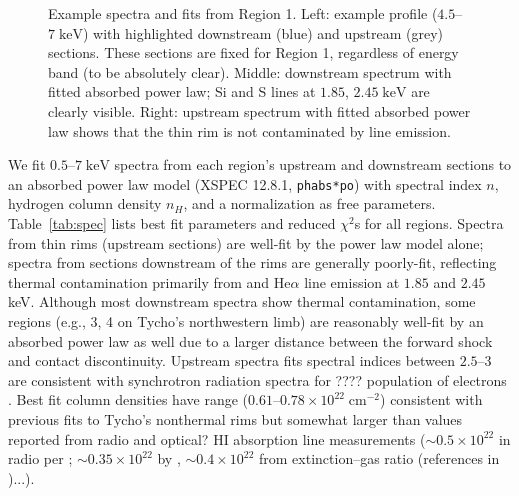 \documentclass[iop, apj, numberedappendix, twocolappendix]{emulateapj}
\newcommand*{\mt}{\mathrm}
\newcommand*{\unit}[1]{\;\mt{#1}}  %
\newcommand*{\abt}{\mathord{\sim}} %
\begin{document}
\begin{figure}
    \caption{Example spectra and fits from Region 1. Left: example profile
    ($4.5$--$7 \unit{keV}$) with highlighted downstream (blue) and upstream
    (grey) sections. These sections are fixed for Region 1, regardless of
    energy band (to be absolutely clear).  Middle: downstream spectrum with
    fitted absorbed power law; Si and S lines at $1.85$, $2.45 \unit{keV}$ are
    clearly visible.  Right: upstream spectrum with fitted absorbed power law
    shows that the thin rim is not contaminated by line emission.}
    \label{fig:spec}
\end{figure}

We fit $0.5$--$7 \unit{keV}$ spectra from each region's upstream and downstream
sections to an absorbed power law model (XSPEC 12.8.1, \texttt{phabs*po}) with
spectral index $n$, hydrogen column density $n_H$, and a normalization as free
parameters.  Table~\ref{tab:spec} lists best fit parameters and reduced
$\chi^2$s for all regions.  Spectra from thin rims (upstream sections) are
well-fit by the power law model alone; spectra from sections downstream of the
rims are generally poorly-fit, reflecting thermal contamination primarily from
 and  He$\alpha$ line emission at $1.85$ and $2.45$ keV.
Although most downstream spectra show thermal contamination, some regions
(e.g., 3, 4 on Tycho's northwestern limb) are reasonably well-fit by an
absorbed power law as well due to a larger distance between the forward shock
and contact discontinuity.
Upstream spectra fits spectral indices between $2.5$--$3$ are consistent with
synchrotron radiation spectra for ???? population of electrons
. Best fit column densities have
range ($0.61$--$0.78 \times 10^{22} \unit{cm^{-2}}$) consistent with previous
fits to Tycho's nonthermal rims \citep{hwang2002} but somewhat larger than
values reported from radio and optical? HI absorption line measurements
($\abt0.5 \times 10^{22}$ in radio \citep{albinson1986} per \citet{hwang2002};
$\abt0.35 \times 10^{22}$ by \citet{kothes2004}, $\abt 0.4 \times 10^{22}$ from
extinction--gas ratio (references in \citet{black1984})...).

\end{document}
